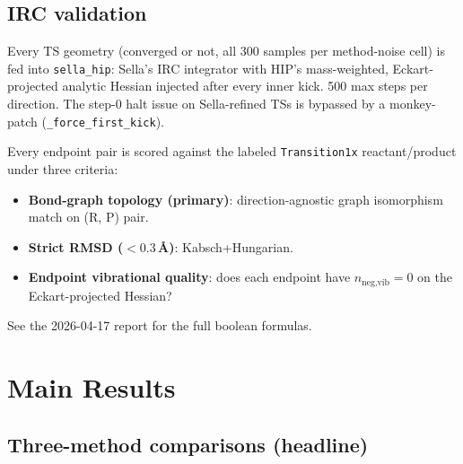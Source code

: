 \documentclass[11pt]{article}
\begin{document}
\subsection{IRC validation}

Every TS geometry (converged or not, all 300 samples per method-noise
cell) is fed into \texttt{sella\_hip}: Sella's IRC integrator with HIP's
mass-weighted, Eckart-projected analytic Hessian injected after every
inner kick. 500 max steps per direction. The step-0 halt issue on
Sella-refined TSs is bypassed by a monkey-patch (\texttt{\_force\_first\_kick}).

Every endpoint pair is scored against the labeled
\texttt{Transition1x} reactant/product under three criteria:

\begin{itemize}[nosep,leftmargin=1.5em]
\item \textbf{Bond-graph topology (primary)}: direction-agnostic
      graph isomorphism match on (R, P) pair.
\item \textbf{Strict RMSD ($<0.3$\,\AA)}: Kabsch+Hungarian.
\item \textbf{Endpoint vibrational quality}: does each endpoint have
      $n_{\text{neg,vib}}=0$ on the Eckart-projected Hessian?
\end{itemize}

See the 2026-04-17 report for the full boolean formulas.

\newpage
\clearpage
\section{Main Results}

\subsection{Three-method comparisons (headline)}
\end{document}
